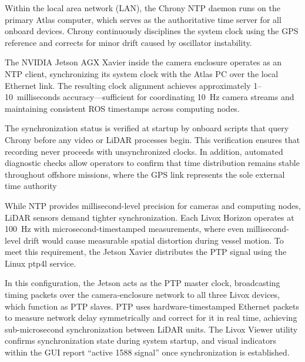 \documentclass{erauthesis}
\begin{document}
Within the local area network (LAN), the Chrony \ac{NTP} daemon runs on the primary Atlas computer, which serves as the authoritative time server for all onboard devices. Chrony continuously disciplines the system clock using the GPS reference and corrects for minor drift caused by oscillator instability.

The NVIDIA Jetson AGX Xavier inside the camera enclosure operates as an \ac{NTP} client, synchronizing its system clock with the Atlas PC over the local Ethernet link. The resulting clock alignment achieves approximately 1–10~milliseconds accuracy—sufficient for coordinating 10~Hz camera streams and maintaining consistent ROS timestamps across computing nodes.

The synchronization status is verified at startup by onboard scripts that query Chrony before any video or LiDAR processes begin. This verification ensures that recording never proceeds with unsynchronized clocks. In addition, automated diagnostic checks allow operators to confirm that time distribution remains stable throughout offshore missions, where the GPS link represents the sole external time authority

While \ac{NTP} provides millisecond-level precision for cameras and computing nodes, LiDAR sensors demand tighter synchronization. Each Livox Horizon operates at 100~Hz with microsecond-timestamped measurements, where even millisecond-level drift would cause measurable spatial distortion during vessel motion. To meet this requirement, the Jetson Xavier distributes the \ac{PTP} signal using the Linux ptp4l service.

In this configuration, the Jetson acts as the \ac{PTP} master clock, broadcasting timing packets over the camera-enclosure network to all three Livox devices, which function as \ac{PTP} slaves. \ac{PTP} uses hardware-timestamped Ethernet packets to measure network delay symmetrically and correct for it in real time, achieving sub-microsecond synchronization between LiDAR units. The Livox Viewer utility confirms synchronization state during system startup, and visual indicators within the GUI report “active 1588 signal” once synchronization is established.
\end{document}
